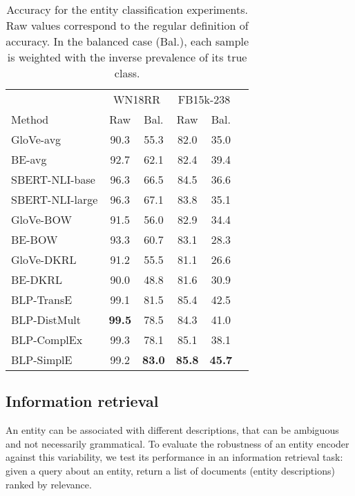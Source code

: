 \documentclass[sigconf]{acmart}
\let\mc\multicolumn
\begin{document}
\begin{table}[t]
\caption{Accuracy for the entity classification experiments. Raw values correspond to the regular definition of accuracy. In the balanced case (Bal.), each sample is weighted with the inverse prevalence of its true class.}
\label{tab:results-classification}
\centering
\begin{tabular}{lccccc}
\toprule
                & \mc{2}{c}{WN18RR}   & \mc{2}{c}{FB15k-238}\\
Method          &    Raw   & Bal. &    Raw   & Bal. \\
\midrule
GloVe-avg       &    90.3 &    55.3 &    82.0 &    35.0 \\
BE-avg          &    92.7 &    62.1 &    82.4 &    39.4 \\
SBERT-NLI-base  &    96.3 &    66.5 &    84.5 &    36.6 \\
SBERT-NLI-large &    96.3 &    67.1 &    83.8 &    35.1 \\
\midrule                                                  
GloVe-BOW       &    91.5 &    56.0 &    82.9 &    34.4 \\ 
BE-BOW          &    93.3 &    60.7 &    83.1 &    28.3 \\ 
GloVe-DKRL      &    91.2 &    55.5 &    81.1 &    26.6 \\ 
BE-DKRL         &    90.0 &    48.8 &    81.6 &    30.9 \\ 
\midrule                                                  
BLP-TransE      &    99.1 &    81.5 &    85.4 &    42.5 \\ 
BLP-DistMult    &\bf 99.5 &    78.5 &    84.3 &    41.0 \\ 
BLP-ComplEx     &    99.3 &    78.1 &    85.1 &    38.1 \\ 
BLP-SimplE      &    99.2 &\bf 83.0 &\bf 85.8 &\bf 45.7 \\
\bottomrule
\end{tabular}
\end{table}

\subsection{Information retrieval}

An entity can be associated with different descriptions, that can be ambiguous and not necessarily grammatical. To evaluate the robustness of an entity encoder against this variability, we test its performance in an information retrieval task: given a query about an entity, return a list of documents (entity descriptions) ranked by relevance.
\end{document}
